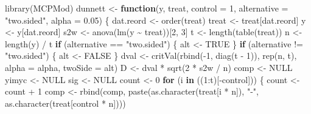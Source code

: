 \documentclass[
]{book}
\newenvironment{Shaded}{\begin{snugshade}}{\end{snugshade}}
\newcommand{\AttributeTok}[1]{\textcolor[rgb]{0.77,0.63,0.00}{#1}}
\newcommand{\ConstantTok}[1]{\textcolor[rgb]{0.00,0.00,0.00}{#1}}
\newcommand{\ControlFlowTok}[1]{\textcolor[rgb]{0.13,0.29,0.53}{\textbf{#1}}}
\newcommand{\DecValTok}[1]{\textcolor[rgb]{0.00,0.00,0.81}{#1}}
\newcommand{\FloatTok}[1]{\textcolor[rgb]{0.00,0.00,0.81}{#1}}
\newcommand{\FunctionTok}[1]{\textcolor[rgb]{0.00,0.00,0.00}{#1}}
\newcommand{\NormalTok}[1]{#1}
\newcommand{\OtherTok}[1]{\textcolor[rgb]{0.56,0.35,0.01}{#1}}
\newcommand{\SpecialCharTok}[1]{\textcolor[rgb]{0.00,0.00,0.00}{#1}}
\newcommand{\StringTok}[1]{\textcolor[rgb]{0.31,0.60,0.02}{#1}}
\begin{document}
\begin{Shaded}
\begin{Highlighting}[]
\FunctionTok{library}\NormalTok{(MCPMod)}
\NormalTok{dunnett }\OtherTok{\textless{}{-}} \ControlFlowTok{function}\NormalTok{(y, treat, }\AttributeTok{control =} \DecValTok{1}\NormalTok{, }\AttributeTok{alternative =} \StringTok{"two.sided"}\NormalTok{, }\AttributeTok{alpha =} \FloatTok{0.05}\NormalTok{) \{}
\NormalTok{  dat.reord }\OtherTok{\textless{}{-}} \FunctionTok{order}\NormalTok{(treat)}
\NormalTok{  treat }\OtherTok{\textless{}{-}}\NormalTok{ treat[dat.reord]}
\NormalTok{  y }\OtherTok{\textless{}{-}}\NormalTok{ y[dat.reord]}
\NormalTok{  s2w }\OtherTok{\textless{}{-}} \FunctionTok{anova}\NormalTok{(}\FunctionTok{lm}\NormalTok{(y }\SpecialCharTok{\textasciitilde{}}\NormalTok{ treat))[}\DecValTok{2}\NormalTok{, }\DecValTok{3}\NormalTok{]}
\NormalTok{  t }\OtherTok{\textless{}{-}} \FunctionTok{length}\NormalTok{(}\FunctionTok{table}\NormalTok{(treat))}
\NormalTok{  n }\OtherTok{\textless{}{-}} \FunctionTok{length}\NormalTok{(y) }\SpecialCharTok{/}\NormalTok{ t}
  \ControlFlowTok{if}\NormalTok{ (alternative }\SpecialCharTok{==} \StringTok{"two.sided"}\NormalTok{) \{}
\NormalTok{    alt }\OtherTok{\textless{}{-}} \ConstantTok{TRUE}
\NormalTok{  \}}
  \ControlFlowTok{if}\NormalTok{ (alternative }\SpecialCharTok{!=} \StringTok{"two.sided"}\NormalTok{) \{}
\NormalTok{    alt }\OtherTok{\textless{}{-}} \ConstantTok{FALSE}
\NormalTok{  \}}
\NormalTok{  dval }\OtherTok{\textless{}{-}} \FunctionTok{critVal}\NormalTok{(}\FunctionTok{rbind}\NormalTok{(}\SpecialCharTok{{-}}\DecValTok{1}\NormalTok{, }\FunctionTok{diag}\NormalTok{(t }\SpecialCharTok{{-}} \DecValTok{1}\NormalTok{)), }\FunctionTok{rep}\NormalTok{(n, t), }\AttributeTok{alpha =}\NormalTok{ alpha, }\AttributeTok{twoSide =}\NormalTok{ alt)}
\NormalTok{  D }\OtherTok{\textless{}{-}}\NormalTok{ dval }\SpecialCharTok{*} \FunctionTok{sqrt}\NormalTok{(}\DecValTok{2} \SpecialCharTok{*}\NormalTok{ s2w }\SpecialCharTok{/}\NormalTok{ n)}
\NormalTok{  comp }\OtherTok{\textless{}{-}} \ConstantTok{NULL}
\NormalTok{  yimyc }\OtherTok{\textless{}{-}} \ConstantTok{NULL}
\NormalTok{  sig }\OtherTok{\textless{}{-}} \ConstantTok{NULL}
\NormalTok{  count }\OtherTok{\textless{}{-}} \DecValTok{0}
  \ControlFlowTok{for}\NormalTok{ (i }\ControlFlowTok{in}\NormalTok{ ((}\DecValTok{1}\SpecialCharTok{:}\NormalTok{t)[}\SpecialCharTok{{-}}\NormalTok{control])) \{}
\NormalTok{    count }\OtherTok{\textless{}{-}}\NormalTok{ count }\SpecialCharTok{+} \DecValTok{1}
\NormalTok{    comp }\OtherTok{\textless{}{-}} \FunctionTok{rbind}\NormalTok{(comp, }\FunctionTok{paste}\NormalTok{(}\FunctionTok{as.character}\NormalTok{(treat[i }\SpecialCharTok{*}\NormalTok{ n]), }\StringTok{"{-}"}\NormalTok{, }\FunctionTok{as.character}\NormalTok{(treat[control }\SpecialCharTok{*}\NormalTok{ n])))}

\end{Highlighting}
\end{Shaded}
\end{document}
